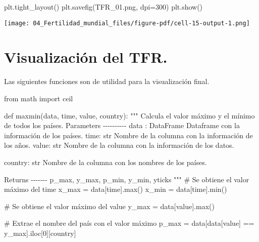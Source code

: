 \documentclass[
  letterpaper,
  DIV=11,
  numbers=noendperiod]{scrreprt}
\newenvironment{Shaded}{\begin{snugshade}}{\end{snugshade}}
\newcommand{\BuiltInTok}[1]{\textcolor[rgb]{0.00,0.23,0.31}{#1}}
\newcommand{\CommentTok}[1]{\textcolor[rgb]{0.37,0.37,0.37}{#1}}
\newcommand{\DecValTok}[1]{\textcolor[rgb]{0.68,0.00,0.00}{#1}}
\newcommand{\ImportTok}[1]{\textcolor[rgb]{0.00,0.46,0.62}{#1}}
\newcommand{\KeywordTok}[1]{\textcolor[rgb]{0.00,0.23,0.31}{#1}}
\newcommand{\NormalTok}[1]{\textcolor[rgb]{0.00,0.23,0.31}{#1}}
\newcommand{\OperatorTok}[1]{\textcolor[rgb]{0.37,0.37,0.37}{#1}}
\newcommand{\StringTok}[1]{\textcolor[rgb]{0.13,0.47,0.30}{#1}}
\begin{document}
\begin{Shaded}
\begin{Highlighting}[]
\NormalTok{plt.tight\_layout()}
\NormalTok{plt.savefig(}\StringTok{\textquotesingle{}TFR\_01.png\textquotesingle{}}\NormalTok{, dpi}\OperatorTok{=}\DecValTok{300}\NormalTok{)}
\NormalTok{plt.show()}
\end{Highlighting}
\end{Shaded}

\texttt{[image: 04\_Fertilidad\_mundial\_files/figure-pdf/cell-15-output-1.png]}

\section{Visualización del TFR.}\label{visualizaciuxf3n-del-tfr.}

Las siguientes funciones son de utilidad para la visualización final.

\begin{Shaded}
\begin{Highlighting}[]
\ImportTok{from}\NormalTok{ math }\ImportTok{import}\NormalTok{ ceil}

\KeywordTok{def}\NormalTok{ maxmin(data, time, value, country):}
    \CommentTok{"""}
\CommentTok{    Calcula el valor máximo y el mínimo de todos los países.}
\CommentTok{    }
\CommentTok{    Parameters}
\CommentTok{    {-}{-}{-}{-}{-}{-}{-}{-}{-}{-}}
\CommentTok{    data : DataFrame}
\CommentTok{        Dataframe con la información de los países.}
\CommentTok{        }
\CommentTok{    time: str}
\CommentTok{        Nombre de la columna con la información de los años.}
\CommentTok{        }
\CommentTok{    value: str}
\CommentTok{        Nombre de la columna con la información de los datos.}

\CommentTok{    country: str}
\CommentTok{        Nombre de la columna con los nombres de los países.}

\CommentTok{    Returns}
\CommentTok{    {-}{-}{-}{-}{-}{-}{-}}
\CommentTok{    p\_max, y\_max, p\_min, y\_min, yticks}
\CommentTok{    """}    
    \CommentTok{\# Se obtiene el valor máximo del time}
\NormalTok{    x\_max }\OperatorTok{=}\NormalTok{ data[time].}\BuiltInTok{max}\NormalTok{()}
\NormalTok{    x\_min }\OperatorTok{=}\NormalTok{ data[time].}\BuiltInTok{min}\NormalTok{()}
    
    \CommentTok{\# Se obtiene el valor máximo del value}
\NormalTok{    y\_max }\OperatorTok{=}\NormalTok{ data[value].}\BuiltInTok{max}\NormalTok{() }

    \CommentTok{\# Extrae el nombre del país con el valor máximo}
\NormalTok{    p\_max }\OperatorTok{=}\NormalTok{ data[data[value] }\OperatorTok{==}\NormalTok{ y\_max].iloc[}\DecValTok{0}\NormalTok{][country]}


\end{Highlighting}
\end{Shaded}
\end{document}
